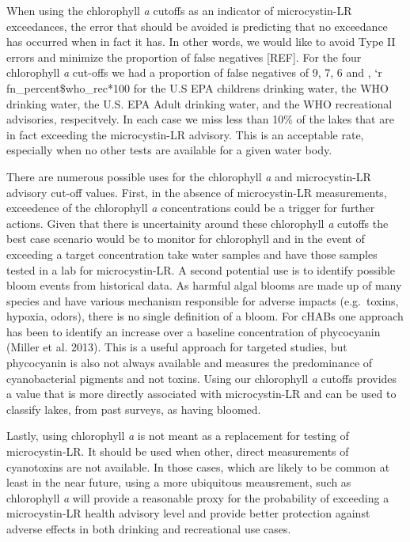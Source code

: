\documentclass[11pt,]{article}
\begin{document}
When using the chlorophyll \emph{a} cutoffs as an indicator of
microcystin-LR exceedances, the error that should be avoided is
predicting that no exceedance has occurred when in fact it has. In other
words, we would like to avoid Type II errors and minimize the proportion
of false negatives {[}REF{]}. For the four chlorophyll \emph{a} cut-offs
we had a proportion of false negatives of 9, 7, 6 and , `r
fn\_percent\$who\_rec*100 for the U.S EPA childrens drinking water, the
WHO drinking water, the U.S. EPA Adult drinking water, and the WHO
recreational advisories, respecitvely. In each case we miss less than
10\% of the lakes that are in fact exceeding the microcystin-LR
advisory. This is an acceptable rate, especially when no other tests are
available for a given water body.

There are numerous possible uses for the chlorophyll \emph{a} and
microcystin-LR advisory cut-off values. First, in the absence of
microcystin-LR measurements, exceedence of the chlorophyll \emph{a}
concentrations could be a trigger for further actions. Given that there
is uncertainity around these chlorophyll \emph{a} cutoffs the best case
scenario would be to monitor for chlorophyll and in the event of
exceeding a target concentration take water samples and have those
samples tested in a lab for microcystin-LR. A second potential use is to
identify possible bloom events from historical data. As harmful algal
blooms are made up of many species and have various mechanism
responsible for adverse impacts (e.g.~toxins, hypoxia, odors), there is
no single definition of a bloom. For cHABs one approach has been to
identify an increase over a baseline concentration of phycocyanin
(Miller et al. 2013). This is a useful approach for targeted studies,
but phycocyanin is also not always available and measures the
predominance of cyanobacterial pigments and not toxins. Using our
chlorophyll \emph{a} cutoffs provides a value that is more directly
associated with microcystin-LR and can be used to classify lakes, from
past surveys, as having bloomed.

Lastly, using chlorophyll \emph{a} is not meant as a replacement for
testing of microcystin-LR. It should be used when other, direct
measurements of cyanotoxins are not available. In those cases, which are
likely to be common at least in the near future, using a more ubiquitous
meausrement, such as chlorophyll \emph{a} will provide a reasonable
proxy for the probability of exceeding a microcystin-LR health advisory
level and provide better protection against adverse effects in both
drinking and recreational use cases.
\end{document}
